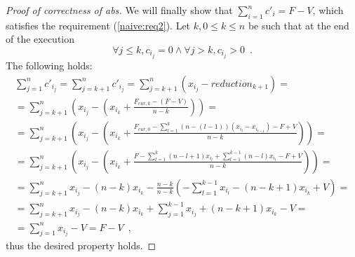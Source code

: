 \begin{proof}[Proof of correctness of abs]
  We will finally show that $\sum\limits_{i=1}^nc'_i = F - V$, which satisfies the requirement (\ref{naive:req2}). Let
  $k, 0 \leq k \leq n$ be such that at the end of the execution
  \begin{equation*}
    \forall j \leq k, c_{i_j} = 0 \wedge \forall j > k, c_{i_j} > 0 \enspace.
  \end{equation*}
  The following holds:
  \begin{equation*}
  \begin{gathered}
    \sum\limits_{j=1}^nc'_{i_j} = \sum\limits_{j=k+1}^nc'_{i_j} = \sum\limits_{j=k+1}^n(x_{i_j} - reduction_{k+1}) = \\
    = \sum\limits_{j=k+1}^n(x_{i_j} - (x_{i_k} + \frac{F_{cur, k} - (F - V)}{n - k})) = \\
    = \sum\limits_{j=k+1}^n(x_{i_j} - (x_{i_k} + \frac{F_{cur, 0} - \sum\limits_{l=1}^k(n - (l - 1))(x_{i_l} - x_{i_{l-1}})
    - F + V}{n - k})) = \\
    = \sum\limits_{j=k+1}^n(x_{i_j} - (x_{i_k} + \frac{F - \sum\limits_{l=1}^k(n - l + 1)x_{i_l} +
    \sum\limits_{l=1}^{k-1}(n - l)x_{i_l} - F + V}{n - k})) = \\
    = \sum\limits_{j=k+1}^nx_{i_j} - (n - k)x_{i_k} - \frac{n - k}{n - k}(-\sum\limits_{l=1}^{k-1}x_{i_l} -
    (n - k + 1)x_{i_k} + V) = \\
    = \sum\limits_{j=k+1}^nx_{i_j} - (n - k)x_{i_k} + \sum\limits_{j=1}^{k-1}x_{i_j} + (n - k + 1)x_{i_k} - V = \\
    = \sum\limits_{j=1}^nx_{i_j} - V = F - V \enspace,
  \end{gathered}
  \end{equation*}
  thus the desired property holds.
\end{proof}
